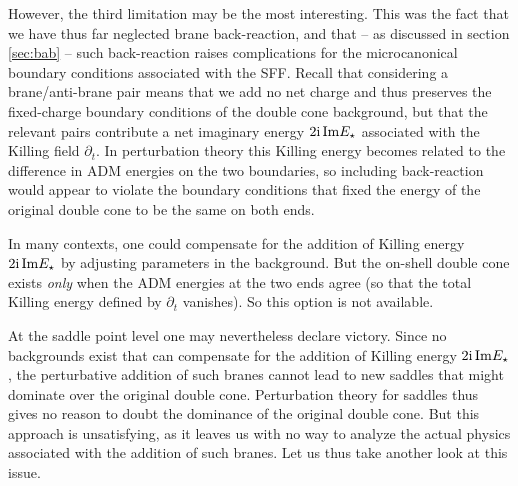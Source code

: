 \documentclass[11pt]{article}
\renewcommand{\i}{\mathrm{i}}
\begin{document}
However, the third limitation may be the most interesting.  
This was the fact that we have thus far neglected brane back-reaction, and that -- as discussed in section \ref{sec:bab} -- such back-reaction raises complications for the microcanonical boundary conditions associated with the SFF.  
Recall that considering a brane/anti-brane pair means that we add no net charge and thus preserves the fixed-charge boundary conditions of the double cone background, but that the relevant pairs contribute a net imaginary energy $2\i\, {\rm Im} E_\star$ associated with the Killing field $\partial_t$.  
In perturbation theory this Killing energy becomes related to the difference in ADM energies on the two boundaries, so including back-reaction would appear to violate the boundary conditions that fixed the energy of the original double cone to be the same on both ends.

In many contexts, one could compensate for the addition of Killing energy $2\i \, {\rm Im} E_\star$  by adjusting parameters in the background.  
But the on-shell double cone exists {\it only} when the ADM energies at the two ends agree (so that the total Killing energy defined by $\partial_t$ vanishes).  
So this option is not available.

At the saddle point level one may nevertheless declare victory.  
Since no backgrounds exist that can compensate for the addition of Killing energy $2\i \, {\rm Im} E_\star$, the perturbative addition of such branes cannot lead to new saddles that might dominate over the original double cone.  
Perturbation theory for saddles thus gives no reason to doubt the dominance of the original double cone. 
But this approach is unsatisfying, as it leaves us with no way to analyze the actual physics associated with the addition of such branes.
Let us thus take another look at this issue.
\end{document}
